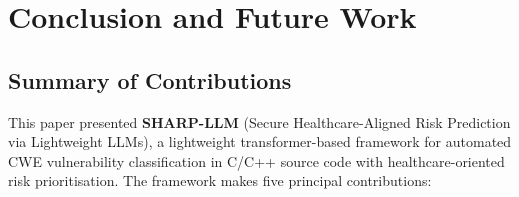 
\section{Conclusion and Future Work}
\label{sec:conclusion}

\subsection{Summary of Contributions}
\label{sec:contributions}

This paper presented \textbf{SHARP-LLM} (Secure Healthcare-Aligned Risk
Prediction via Lightweight LLMs), a lightweight transformer-based framework
for automated CWE vulnerability classification in C/C++ source code with
healthcare-oriented risk prioritisation.  The framework makes five principal
contributions:

